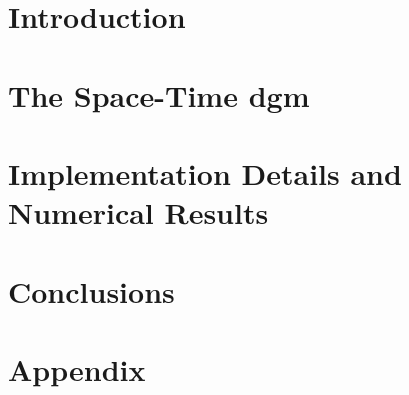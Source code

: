 




\section{Introduction}




\section{The Space-Time \texorpdfstring{\acrlong{dgm}}{}}




\section{Implementation Details and Numerical Results}




\section{Conclusions}




\begin{frame}[allowframebreaks]
    \nocite{*}
    \printbibliography
\end{frame}


\section*{Appendix}

